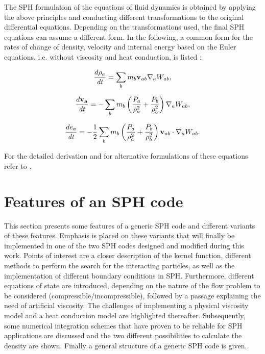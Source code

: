 \documentclass{report}
\begin{document}
The SPH formulation of the equations of fluid
dynamics is obtained by applying the above principles and conducting different
transformations to the original differential equations. Depending on the
transformations used, the final SPH equations can assume a different form. In
the following, a common form for the rates of change of density, velocity and
internal energy based on the Euler equations, i.e. without viscosity and heat conduction, is listed \cite{Monaghan2005,Liu2003}: 

\begin{equation}
\label{eq:DCR_Euler}
\frac{d\rho _a}{\mathit{dt}}=\sum_b{m_{b}{\bf v_{\mathit{ab}}}\nabla _{a}W_{\mathit{ab}}},
\end{equation}

\begin{equation}
\label{eq:VCR_Euler}
\frac{ d {\bf v_{a}}}{\mathit{dt}}=-\sum_b {m_{b}\left(\frac{P_{a}}{\rho_{a}^{2}}+\frac{P_{b}}{\rho _{b}^{2}}\right)\nabla_{a}W_{ab}},
\end{equation}


\begin{equation}
\label{eq:ECR_Euler}
\frac{de_{a}}{\mathit{dt}}=-\mathit{}\frac{1}{2}\sum_b{m_{b}\left(\frac{P_{a}}{\rho _{a}^{2}}+\frac{P_{b}}{\rho _{b}^{2}}\right){\bf v_{\mathit{ab}}}\cdot\nabla _{a}W_{\mathit{ab}}}.
\end{equation}

For the detailed derivation and for alternative formulations of
these equations refer to \cite{Monaghan2005, Liu2003}.



\section{Features of an SPH code}
\label{sec:FeaturesOfSPH}
This section presents some features of a generic SPH code and different variants of these features. Emphasis is
placed on these variants that will finally be implemented in one of the
two SPH codes designed and modified during this work.
Points of interest are a closer description of the kernel function, different methods to perform the search for the interacting particles, as well as the implementation of different boundary conditions in
SPH. Furthermore, different
equations of state are introduced, depending on the nature of the flow problem
to be considered (compressible/incompressible), followed by a passage
explaining the need of artificial viscosity. The challenges of implementing a physical viscosity model and a heat conduction model are highlighted thereafter. Subsequently, some numerical
integration schemes that have proven to be reliable for SPH applications are discussed and the two different possibilities to calculate the density are shown. Finally a general structure of a generic SPH code is given.
\end{document}

